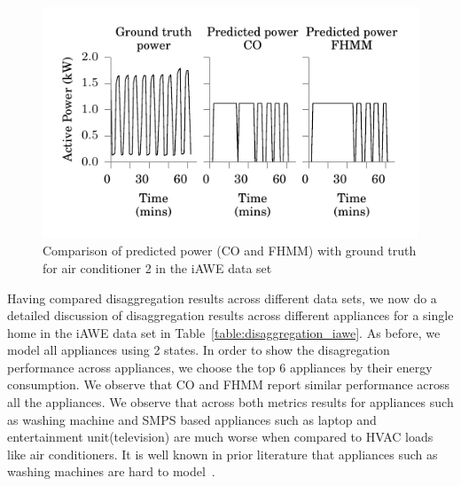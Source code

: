 \documentclass{sig-alternate}
\newcommand{\tabref}[1]{Table~\ref{#1}}
\begin{document}
\begin{figure}
\includegraphics{figures/ac_2.pdf} 
\caption{Comparison of predicted power (CO and FHMM) with ground truth for air conditioner 2 in the iAWE data set}
\label{fig:ac_disaggregation} 
\end{figure}

\noindent
Having compared disaggregation results across different data sets, we now do a detailed discussion of disaggregation results across different appliances for a single home in the iAWE data set in \tabref{table:disaggregation_iawe}. As before, we model all appliances using 2 states. In order to show the disagregation performance across appliances, we choose the top 6 appliances by their energy consumption. We observe that CO and FHMM report similar performance across all the appliances. We observe that across both metrics results for appliances such as washing machine and SMPS based appliances such as laptop and entertainment unit(television) are much worse when compared to HVAC loads like air conditioners. It is well known in prior literature that appliances such as washing machines are hard to model~\cite{barker_2013}.
\end{document}
